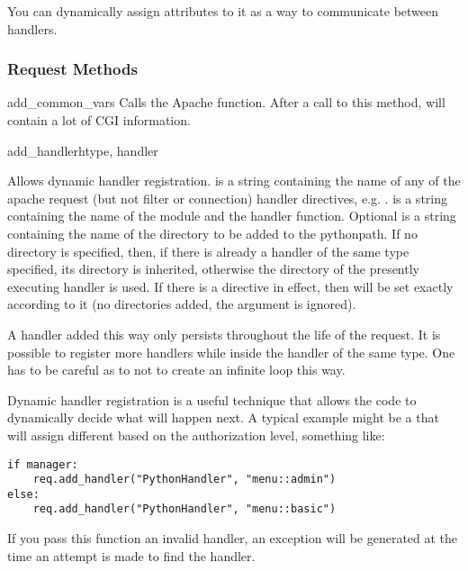 You can dynamically assign attributes to it as a way to communicate
between handlers.

\subsubsection{Request Methods\label{pyapi-mprequest-meth}}

\begin{methoddesc}[request]{add_common_vars}{}
  Calls the Apache  function. After a
  call to this method,  will contain a
  lot of CGI information.
\end{methoddesc}

\begin{methoddesc}[request]{add_handler}{htype, handler}

  Allows dynamic handler registration.  is a string
  containing the name of any of the apache request (but not filter or
  connection) handler directives,
  e.g. .  is a string containing the
  name of the module and the handler function.  Optional  is
  a string containing the name of the directory to be added to the
  pythonpath. If no directory is specified, then, if there is already
  a handler of the same type specified, its directory is inherited,
  otherwise the directory of the presently executing handler is
  used. If there is a  directive in effect, then
   will be set exactly according to it (no directories
  added, the  argument is ignored).
  
  A handler added this way only persists throughout the life of the
  request. It is possible to register more handlers while inside the
  handler of the same type. One has to be careful as to not to create
  an infinite loop this way.

  Dynamic handler registration is a useful technique that allows the
  code to dynamically decide what will happen next. A typical example
  might be a  that will assign different
   based on the authorization level, something
  like:

  \begin{verbatim}
if manager:
    req.add_handler("PythonHandler", "menu::admin")
else:
    req.add_handler("PythonHandler", "menu::basic")
  \end{verbatim}                              

  \begin{notice}
    If you pass this function an invalid handler, an exception will be
    generated at the time an attempt is made to find the handler. 
  \end{notice}

\end{methoddesc}

